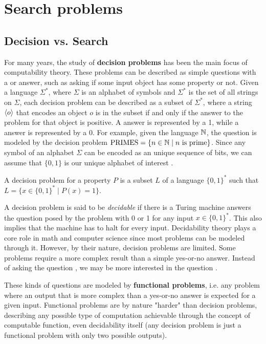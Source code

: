 
\chapter{Search problems} \label{chap:search_problems}

\section{Decision vs. Search}

For many years, the study of \textbf{decision problems} has been the main focus of computability theory. These problems can be described as simple questions with a  or  answer, such as asking if some input object has some property or not. Given a language $\Sigma^*$, where $\Sigma$ is an alphabet of symbols and $\Sigma^*$ is the set of all strings on $\Sigma$, each decision problem can be described as a subset of $\Sigma^*$, where a string $\left\langle o\right\rangle$ that encodes an object $o$ is in the subset if and only if the answer to the problem for that object is positive. A  answer is represented by a 1, while a  answer is represented by a 0. For example, given the language $\mathbb{N}$, the question  is modeled by the decision problem $\mathrm{PRIMES} = \{n \in \mathbb{N} \mid n \text{ is prime}\}$. Since any symbol of an alphabet $\Sigma$ can be encoded as an unique sequence of bits, we can assume that $\{0,1\}$ is our unique alphabet of interest \cite{complexity_arora_barak,sipser_computation}.

\begin{definition}
 A decision problem for a property $P$ is a subset $L$ of a language $\{0,1\}^*$ such that $L = \{x \in \{0,1\}^* \mid P(x) = 1\}$.
\end{definition}

A decision problem is said to be \textit{decidable} if there is a Turing machine answers the question posed by the problem with 0 or 1 for any input $x \in \{0,1\}^*$. This also implies that the machine has to halt for every input. Decidability theory plays a core role in math and computer science since most problems can be modeled through it. However, by their nature, decision problems are limited. Some problems require a more complex result than a simple yes-or-no answer. Instead of asking the question , we may be more interested in the question .

These kinds of questions are modeled by \textbf{functional problems}, i.e. any problem where an output that is more complex than a yes-or-no answer is expected for a given input. Functional problems are by nature "harder" than decision problems, describing any possible type of computation achievable through the concept of computable function, even decidability itself (any decision problem is just a functional problem with only two possible outputs).

